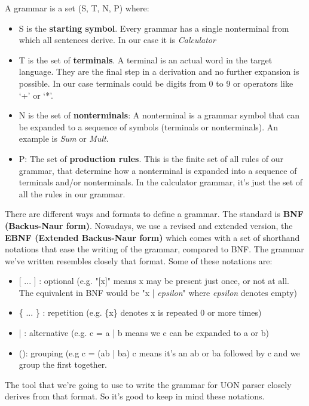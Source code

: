 \documentclass[12pt]{article}
\begin{document}
A grammar is a set (S, T, N, P) where:
\begin{itemize}
    \item S is the \textbf{starting symbol}. Every grammar has a single nonterminal from which all sentences derive. In our case it is \emph{Calculator}
    \item T is the set of \textbf{terminals}. A terminal is an actual word in the target language. They are the final step in a derivation and no further expansion is possible. In our case terminals could be digits from 0 to 9 or operators like ‘+’ or ‘*’.
    \item N is the set of \textbf{nonterminals}: A nonterminal is a grammar symbol that can be expanded to a sequence of symbols (terminals or nonterminals). An example is \emph{Sum} or \emph{Mult}.
    \item P: The set of \textbf{production rules}. This is the finite set of all rules of our grammar, that determine how a nonterminal is expanded into a sequence of terminals and/or nonterminals. In the calculator grammar, it's just the set of all the rules in our grammar.
\end{itemize}

There are different ways and formats to define a grammar. The standard is \textbf{BNF (Backus-Naur form)}. Nowadays, we use a revised and extended version, the \textbf{EBNF (Extended Backus-Naur form)} which comes with a set of shorthand notations that ease the writing of the grammar, compared to BNF. The grammar we’ve written resembles closely that format. Some of these notations are:
\begin{itemize}
    \item {[ ... ]} : optional (e.g. "[x]" means x may be present just once, or not at all. The equivalent in BNF would be "x | \emph{epsilon}" where \emph{epsilon} denotes empty) 
    \item \{ ... \} : repetition (e.g. \{x\} denotes x is repeated 0 or more times)
    \item | : alternative (e.g. c = a | b means we c can be expanded to a or b)
    \item (): grouping (e.g c = (ab | ba) c means it’s an ab or ba followed by c and we group the first together.
\end{itemize}
The tool that we’re going to use to write the grammar for UON parser closely derives from that format. So it’s good to keep in mind these notations.
\end{document}
